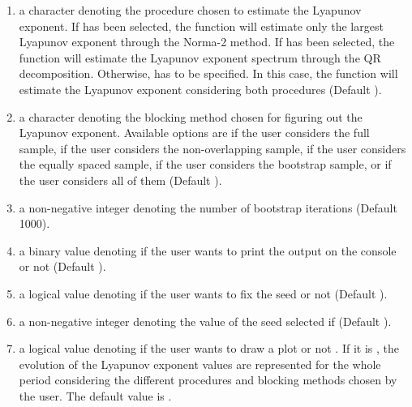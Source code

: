 \begin{enumerate}
\item[]  a character denoting the procedure chosen to estimate the Lyapunov exponent. If  has been selected, the function will estimate only the largest Lyapunov exponent through the Norma-2 method. If  has been selected, the function will estimate the Lyapunov exponent spectrum through the QR decomposition. Otherwise,  has to be specified. In this case, the function will estimate the Lyapunov exponent considering both procedures (Default ).
\item[]  a character denoting the blocking method chosen for figuring out the Lyapunov exponent. Available options are  if the user considers the full sample,  if the user considers the non-overlapping sample,  if the user considers the equally spaced sample,  if the user considers the bootstrap sample, or  if the user considers all of them (Default ).
\item[]  a non-negative integer denoting the number of bootstrap iterations (Default 1000).
\item[]  a binary value denoting if the user wants to print the output on the console  or
not  (Default ).
\item[]  a logical value denoting if the user wants to fix the seed  or not 
(Default ).
\item[]  a non-negative integer denoting the value of the seed selected if  (Default ).
\item[]  a logical value denoting if the user wants to draw a plot  or not . If it is , the evolution of the Lyapunov exponent values are represented for the whole period considering the different procedures and blocking methods chosen by the user. The default value is .
\end{enumerate}

